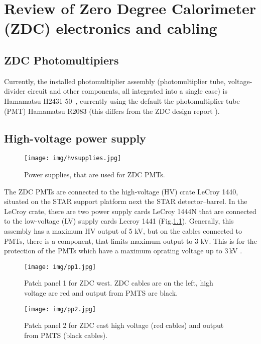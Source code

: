 \chapter{Review of Zero Degree Calorimeter (ZDC) electronics and cabling}
\section{ZDC Photomultipiers}
Currently, the installed photomultiplier assembly (photomultiplier tube, voltage-divider circuit and other components, all integrated into a single case) is Hamamatsu H2431-50~\cite{PMTtube}, currently using the default the photomultiplier tube (PMT) Hamamatsu R2083 (this differs from the ZDC design report \cite{ZDCdocumentation}).

\section{High-voltage power supply}

\begin{figure}[b]
\begin{center}
\texttt{[image: img/hvsupplies.jpg]}
\end{center}
\caption{Power supplies, that are used for ZDC PMTs.}
\label{hvsupplies}
\end{figure}

The ZDC PMTs are connected to the high-voltage (HV) crate LeCroy 1440, situated on the STAR support platform next the STAR detector--barrel. In the LeCroy crate, there are two power supply cards LeCroy 1444N that are connected to the low-voltage (LV) supply cards Lecroy 1441 (Fig.\ref{hvsupplies}). Generally, this assembly has a maximum HV output of 5 kV, but on the cables connected to PMTs, there is a component, that limits maximum output to 3 kV. This is for the protection of the PMTs which have a maximum oprating voltage up to 3$\,$kV \cite{PMTtube}.

\begin{figure}[b]
\begin{center}
\texttt{[image: img/pp1.jpg]}
\end{center}
\caption{Patch panel 1 for ZDC west.  ZDC cables are on the left, high voltage are red and output from PMTS are black.}
\label{pp1}
\end{figure}

\begin{figure}[b]
\begin{center}
\texttt{[image: img/pp2.jpg]}
\end{center}
\caption{Patch panel 2 for ZDC east high voltage (red cables) and output from PMTS (black cables).}
\label{pp2}
\end{figure}

